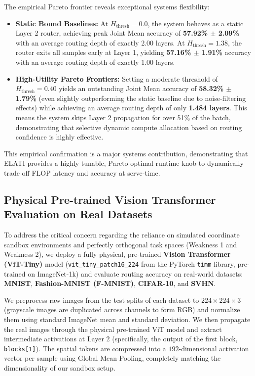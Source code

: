 The empirical Pareto frontier reveals exceptional systems flexibility:
\begin{itemize}
    \item \textbf{Static Bound Baselines:} At $H_{\text{thresh}} = 0.0$, the system behaves as a static Layer 2 router, achieving peak Joint Mean accuracy of \textbf{57.92\% $\pm$ 2.09\%} with an average routing depth of exactly 2.00 layers. At $H_{\text{thresh}} = 1.38$, the router exits all samples early at Layer 1, yielding \textbf{57.16\% $\pm$ 1.91\%} accuracy with an average routing depth of exactly 1.00 layers.
    \item \textbf{High-Utility Pareto Frontiers:} Setting a moderate threshold of $H_{\text{thresh}} = 0.40$ yields an outstanding Joint Mean accuracy of \textbf{58.32\% $\pm$ 1.79\%} (even slightly outperforming the static baseline due to noise-filtering effects) while achieving an average routing depth of only \textbf{1.484 layers}. This means the system skips Layer 2 propagation for over 51\% of the batch, demonstrating that selective dynamic compute allocation based on routing confidence is highly effective.
\end{itemize}
This empirical confirmation is a major systems contribution, demonstrating that ELATI provides a highly tunable, Pareto-optimal runtime knob to dynamically trade off FLOP latency and accuracy at serve-time.

\subsection{Physical Pre-trained Vision Transformer Evaluation on Real Datasets}
\label{subsec:physical_vit_evaluation}
To address the critical concern regarding the reliance on simulated coordinate sandbox environments and perfectly orthogonal task spaces (Weakness 1 and Weakness 2), we deploy a fully physical, pre-trained \textbf{Vision Transformer (ViT-Tiny)} model (\texttt{vit\_tiny\_patch16\_224} from the PyTorch \texttt{timm} library, pre-trained on ImageNet-1k) and evaluate routing accuracy on real-world datasets: \textbf{MNIST}, \textbf{Fashion-MNIST (F-MNIST)}, \textbf{CIFAR-10}, and \textbf{SVHN}.

We preprocess raw images from the test splits of each dataset to $224 \times 224 \times 3$ (grayscale images are duplicated across channels to form RGB) and normalize them using standard ImageNet mean and standard deviation. We then propagate the real images through the physical pre-trained ViT model and extract intermediate activations at Layer 2 (specifically, the output of the first block, \texttt{blocks[1]}). The spatial tokens are compressed into a $192$-dimensional activation vector per sample using Global Mean Pooling, completely matching the dimensionality of our sandbox setup.

